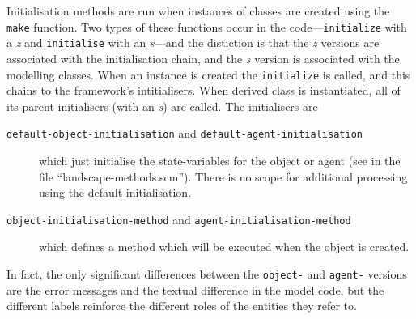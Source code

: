 Initialisation methods are run when instances of classes are created
using the \texttt{make} function.  Two types of these functions occur
in the code---\texttt{initialize} with a \emph{z} and
\texttt{initialise} with an \emph{s}---and the distiction is that
the \emph{z} versions are associated with the \SCLOS initialisation
chain, and the \emph{s} version is associated with the modelling
classes. When an instance is created the 
\texttt{initialize} is called, and this chains to the framework's
intitialisers.  When  derived class is instantiated, all of
its parent initialisers (with an \emph{s}) are called.  The
initialisers are
\begin{description}
  \item[\texttt{default-object-initialisation} and
    \texttt{default-agent-initialisation}] which just initialise the
    state-variables for the object or agent (see  in the
    file ``landscape-methods.scm''). There is no scope for additional
    processing using the default initialisation.
  \item[\texttt{object-initialisation-method} and
    \texttt{agent-initialisation-method}] which defines a method which
    will be executed when the object is created.
\end{description}
In fact, the only significant differences between the \texttt{object-}
and \texttt{agent-} versions are the error messages and the textual
difference in the model code, but the different labels reinforce the
different roles of the entities they refer to.
    

